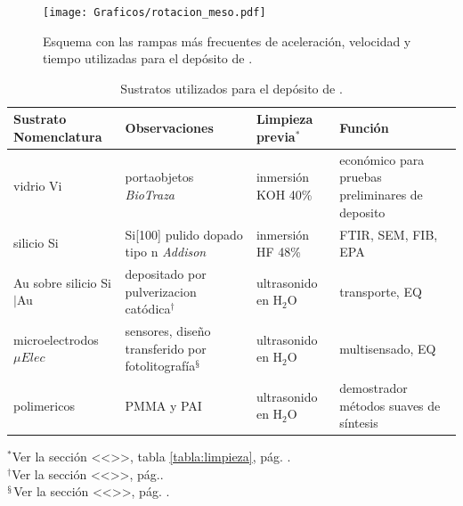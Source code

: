 					\begin{figure}[!ht]
						 \begin{center}
						 \texttt{[image: Graficos/rotacion\_meso.pdf]}
						 \caption[Parámetros de depósito para las \pdm]{Esquema con las rampas más frecuentes de aceleración, velocidad y tiempo utilizadas para el depósito de \pdm.}
						 \label{fig:rampa-spin}
						 \end{center}
						 \end{figure}

			 	    \begin{table}[ht!]
			  		   \caption[Sustratos utilizados para el depósito de \pdm]{Sustratos utilizados para el depósito de \pdm.} 
			  		   \begin{tabular}{>{\raggedright\arraybackslash}m{2.4cm}>{\raggedright\arraybackslash}m{2.5cm}>{\raggedright\arraybackslash}m{2cm}>{\raggedright\arraybackslash}m{3.55cm}} 
			  		   \toprule
					   Sustrato Nomenclatura   & Observaciones  & Limpieza previa$^*$ & Función \\ \midrule
			       	   vidrio \hspace{2cm} Vi  &	portaobjetos \textit{BioTraza} & inmersión KOH 40\% & económico para pruebas preliminares de deposito \\ \midrule
			       	   silicio\hspace{2cm} Si  & Si[100] pulido dopado tipo n  \textit{Addison}& inmersión HF 48\% & FTIR, SEM, FIB, EPA \\ \midrule
			       	   Au sobre silicio\hspace{2cm} Si$|$Au & depositado por pulverizacion catódica$^\dagger$  & ultrasonido en H$_2$O  & transporte, EQ\\ \midrule
			      	   microelectrodos \hspace{2cm} $\mu Elec$ & sensores, diseño transferido por fotolitografía$^\mathsection$  	  &  ultrasonido en H$_2$O  & multisensado, EQ \\ \midrule
			      	   polimericos         &  PMMA y PAI		  &  ultrasonido en H$_2$O &  demostrador métodos suaves de síntesis\\ 
			      	   \bottomrule
			    	   \end{tabular}\vspace*{2pt}
			    	   \footnotesize{$^*$Ver la sección <<>>, tabla \ref{tabla:limpieza}, pág. \pageref{sec:limpieza}.}\\
			    	   \footnotesize{$^\dagger$Ver la sección <<>>, pág.\pageref{sec:sputt}.} \\
			    	   \footnotesize{$^\mathsection$Ver la sección <<>>, pág. \pageref{sec:sputt}.}
			    	   \label{tabla:sustratos}
			   		   \end{table}
			
